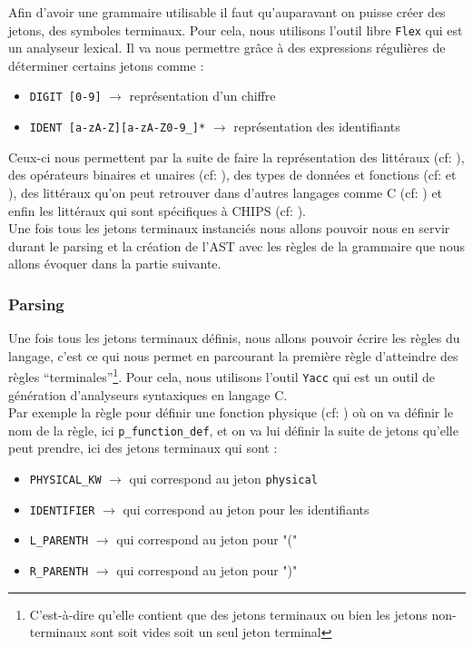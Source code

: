 \documentclass[a4paper, 11pt]{article}
\newcommand{\prog}[1]{\texttt{#1}}
\begin{document}
Afin d'avoir une grammaire utilisable il faut qu'auparavant on puisse créer des jetons, des symboles terminaux. Pour cela, nous utilisons l'outil libre \prog{Flex} qui est un analyseur lexical. Il va nous permettre grâce à des expressions régulières de déterminer certains jetons comme :
\begin{itemize}
    \item \prog{DIGIT [0-9]} $\longrightarrow$ représentation d'un chiffre
    \item \prog{IDENT [a-zA-Z][a-zA-Z0-9\_]*} $\longrightarrow$ représentation des identifiants
\end{itemize}

Ceux-ci nous permettent par la suite de faire la représentation des littéraux (cf: ), des opérateurs binaires et unaires (cf: ), des types de données et fonctions (cf:  et ), des littéraux qu'on peut retrouver dans d'autres langages comme C (cf: ) et enfin les littéraux qui sont spécifiques à CHIPS (cf: ). \\

Une fois tous les jetons terminaux instanciés nous allons pouvoir nous en servir durant le parsing et la création de l'AST avec les règles de la grammaire que nous allons évoquer dans la partie suivante.

\subsubsection{Parsing}

Une fois tous les jetons terminaux définis, nous allons pouvoir écrire les règles du langage, c'est ce qui nous permet en parcourant la première règle d'atteindre des règles ``terminales''\footnote{C'est-à-dire qu'elle contient que des jetons terminaux ou bien les jetons non-terminaux sont soit vides soit un seul jeton terminal}. Pour cela, nous utilisons l'outil \prog{Yacc} qui est un outil de génération d'analyseurs syntaxiques en langage C. \\

Par exemple la règle pour définir une fonction physique (cf: ) où on va définir le nom de la règle, ici \prog{p\_function\_def}, et on va lui définir la suite de jetons qu'elle peut prendre, ici des jetons terminaux qui sont : 
\begin{itemize}
    \item \prog{PHYSICAL\_KW} $\longrightarrow$ qui correspond au jeton \prog{physical}
    \item \prog{IDENTIFIER} $\longrightarrow$ qui correspond au jeton pour les identifiants
    \item \prog{L\_PARENTH} $\longrightarrow$ qui correspond au jeton pour "("
    \item \prog{R\_PARENTH} $\longrightarrow$ qui correspond au jeton pour ")"
\end{itemize}
\end{document}
